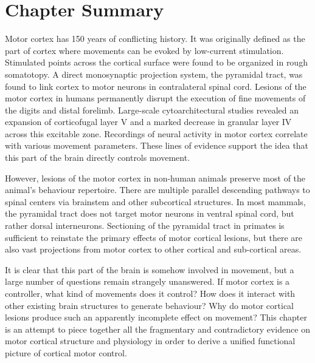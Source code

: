 				
\section{Chapter Summary}

Motor cortex has 150 years of conflicting history. It was originally defined as the part of cortex where movements can be evoked by low-current stimulation. Stimulated points across the cortical surface were found to be organized in rough somatotopy. A direct monosynaptic projection system, the pyramidal tract, was found to link cortex to motor neurons in contralateral spinal cord. Lesions of the motor cortex in humans permanently disrupt the execution of fine movements of the digits and distal forelimb. Large-scale cytoarchitectural studies revealed an expansion of corticofugal layer V and a marked decrease in granular layer IV across this excitable zone. Recordings of neural activity in motor cortex correlate with various movement parameters. These lines of evidence support the idea that this part of the brain directly controls movement.

However, lesions of the motor cortex in non-human animals preserve most of the animal's behaviour repertoire. There are multiple parallel descending pathways to spinal centers via brainstem and other subcortical structures. In most mammals, the pyramidal tract does not target motor neurons in ventral spinal cord, but rather dorsal interneurons. Sectioning of the pyramidal tract in primates is sufficient to reinstate the primary effects of motor cortical lesions, but there are also vast projections from motor cortex to other cortical and sub-cortical areas.

It is clear that this part of the brain is somehow involved in movement, but a large number of questions remain strangely unanswered. If motor cortex is a controller, what kind of movements does it control? How does it interact with other existing brain structures to generate behaviour? Why do motor cortical lesions produce such an apparently incomplete effect on movement? This chapter is an attempt to piece together all the fragmentary and contradictory evidence on motor cortical structure and physiology in order to derive a unified functional picture of cortical motor control.

\pagebreak



